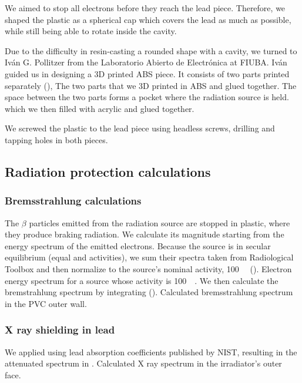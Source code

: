 We aimed to stop all electrons before they reach the lead piece.
Therefore, we shaped the plastic as a spherical cap which covers
the lead as much as possible,
while still being able to rotate inside the cavity.

Due to the difficulty in resin-casting a rounded shape with a cavity,
we turned to Iván G. Pollitzer from the
Laboratorio Abierto de Electrónica at FIUBA.
Iván guided us in designing a 3D printed ABS piece.
It consists of two parts printed separately
(),
{The two parts that we 3D printed in ABS and glued together.
The space between the two parts forms a pocket where the radiation source is held.}
which we then filled with acrylic and glued together.

We screwed the plastic to the lead piece using headless screws,
drilling and tapping holes in both pieces.
\subsection{Radiation protection calculations}
%
\subsubsection{Bremsstrahlung calculations}
The $\beta$ particles emitted from the radiation source are stopped in plastic,
where they produce braking radiation.
We calculate its magnitude starting from the energy spectrum of the emitted electrons.
Because the source is in secular equilibrium (equal \Strontium and \Yttrium activities),
we sum their spectra taken from
Radiological Toolbox\cite{eckerman2006radiological}
and then normalize to the source's nominal activity, \SI{100}{\milli\curie}
().
{Electron energy spectrum for a
\Strontium source whose activity is \SI{100}{\milli\curie}\cite{eckerman_icrp_2007}.}
We then calculate the bremstrahlung spectrum by integrating 
().
{Calculated bremsstrahlung spectrum in the PVC outer wall.}
%
\subsubsection{X ray shielding in lead}
We applied  
using lead absorption coefficients published by NIST\cite{xraycoef},
resulting in the attenuated spectrum in .
{Calculated X ray spectrum in the irradiator's outer face.}
%
%
